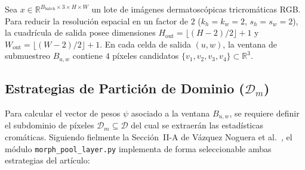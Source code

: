 \documentclass[10pt,a4paper,twocolumn]{article}
\begin{document}
Sea $x \in \mathbb{R}^{B_{\text{batch}} \times 3 \times H \times W}$ un lote de imágenes dermatoscópicas tricromáticas RGB. Para reducir la resolución espacial en un factor de $2$ ($k_h = k_w = 2$, $s_h = s_w = 2$), la cuadrícula de salida posee dimensiones $H_{\text{out}} = \lfloor (H - 2)/2 \rfloor + 1$ y $W_{\text{out}} = \lfloor (W - 2)/2 \rfloor + 1$. En cada celda de salida $(u, w)$, la ventana de submuestreo $B_{u,w}$ contiene $4$ píxeles candidatos $\{v_1, v_2, v_3, v_4\} \subset \mathbb{R}^3$.

\subsection{Estrategias de Partición de Dominio ($\mathcal{D}_m$)}
Para calcular el vector de pesos $\psi$ asociado a la ventana $B_{u,w}$, se requiere definir el subdominio de píxeles $\mathcal{D}_m \subseteq \mathcal{D}$ del cual se extraerán las estadísticas cromáticas. Siguiendo fielmente la Sección~II-A de Vázquez Noguera et al.~\cite{vazquez2019adaptive}, el módulo \texttt{morph\_pool\_layer.py} implementa de forma seleccionable ambas estrategias del artículo:
\end{document}
